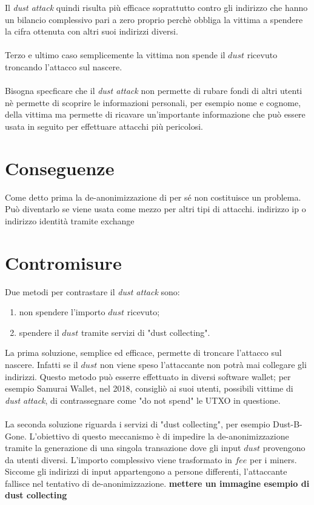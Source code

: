 \FloatBarrier
Il \textit{dust attack} quindi risulta più efficace soprattutto contro gli indirizzo che hanno un bilancio complessivo pari a zero proprio perchè obbliga la vittima a spendere la cifra ottenuta con altri suoi indirizzi diversi.\\\\
Terzo e ultimo caso semplicemente la vittima non spende il $dust$ ricevuto troncando l'attacco sul nascere.\\\\
Bisogna specficare che il \textit{dust attack} non permette di rubare fondi di altri utenti nè permette di scoprire le informazioni personali, per esempio nome e cognome, della vittima ma permette di ricavare un'importante informazione che può essere usata in seguito per effettuare attacchi più pericolosi.

\section{Conseguenze}
Come detto prima la de-anonimizzazione di per sé non costituisce un problema. Può diventarlo se viene usata come mezzo per altri tipi di attacchi. 
\legame indirizzo ip o indirizzo identità tramite exchange
\section{Contromisure}
Due metodi per contrastare il \textit{dust attack} sono:
    \begin{enumerate}
        \item non spendere l'importo $dust$ ricevuto; 
        \item spendere il $dust$ tramite servizi di "dust collecting". 
    \end{enumerate}
La prima soluzione, semplice ed efficace, permette di troncare l'attacco sul nascere. Infatti se il $dust$ non viene speso l'attaccante non potrà mai collegare gli indirizzi. 
Questo metodo può esserre effettuato in diversi software wallet; per esempio Samurai Wallet\cite{SamuraiWallet}, nel 2018, consigliò ai suoi utenti, possibili vittime di \textit{dust attack},  di contrassegnare come "do not spend" le UTXO in questione.\\\\
La seconda soluzione riguarda i servizi di "dust collecting", per esempio Dust-B-Gone\cite{Dbg}.
L'obiettivo di questo meccanismo è di impedire la de-anonimizzazione tramite la generazione di una singola transazione dove gli input $dust$ provengono da utenti diversi. L'importo complessivo viene trasformato in $fee$ per i miners. \\Siccome gli indirizzi di input appartengono a persone differenti, l'attaccante fallisce nel tentativo di de-anonimizzazione.
\textbf{mettere un immagine esempio di dust collecting}